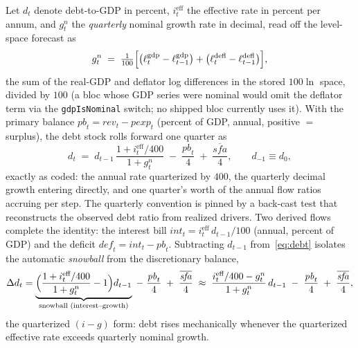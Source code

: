 \documentclass[11pt]{article}
\theoremstyle{plain}
\theoremstyle{remark}
\begin{document}
Let $d_t$ denote debt-to-GDP in percent, $i^{\text{eff}}_t$ the
effective rate in percent per annum, and $g^{n}_t$ the \emph{quarterly}
nominal growth rate in decimal, read off the level-space forecast as
\begin{equation}\label{eq:gn}
  g^{n}_t \;=\;
  \tfrac{1}{100}\Bigl[
   \bigl(\ell^{\text{gdp}}_t - \ell^{\text{gdp}}_{t-1}\bigr)
 + \bigl(\ell^{\text{defl}}_t - \ell^{\text{defl}}_{t-1}\bigr)\Bigr],
\end{equation}
the sum of the real-GDP and deflator log differences in the stored
$100\ln$ space, divided by $100$ (a bloc whose GDP series were nominal
would omit the deflator term via the \texttt{gdpIsNominal} switch; no
shipped bloc currently uses it). With the primary balance
$\mathit{pb}_t = \mathit{rev}_t - \mathit{pexp}_t$ (percent of GDP,
annual, positive $=$ surplus), the debt stock rolls forward one quarter
as
\begin{equation}\label{eq:debt}
  d_t \;=\; d_{t-1}\,
     \frac{1 + i^{\text{eff}}_t/400}{1 + g^{n}_t}
     \;-\; \frac{\mathit{pb}_t}{4}
     \;+\; \frac{\overline{\mathit{sfa}}}{4},
  \qquad d_{-1} \equiv d_0,
\end{equation}
exactly as coded: the annual rate quarterized by $400$, the quarterly
decimal growth entering directly, and one quarter's worth of the annual
flow ratios accruing per step. The quarterly convention is pinned by a
back-cast test that reconstructs the observed debt ratio from realized
drivers. Two derived flows complete the identity: the interest bill
$\mathit{int}_t = i^{\text{eff}}_t\, d_{t-1}/100$ (annual, percent of
GDP) and the deficit $\mathit{def}_t = \mathit{int}_t - \mathit{pb}_t$.
Subtracting $d_{t-1}$ from~\eqref{eq:debt} isolates the automatic
\emph{snowball} from the discretionary balance,
\begin{equation}\label{eq:snowball}
  \Delta d_t
  = \underbrace{\Bigl(\frac{1 + i^{\text{eff}}_t/400}{1 + g^{n}_t} - 1\Bigr) d_{t-1}}_{\text{snowball (interest--growth)}}
  \;-\; \frac{\mathit{pb}_t}{4} \;+\; \frac{\overline{\mathit{sfa}}}{4}
  \;\approx\;
  \frac{i^{\text{eff}}_t/400 - g^{n}_t}{1 + g^{n}_t}\, d_{t-1}
  \;-\; \frac{\mathit{pb}_t}{4} \;+\; \frac{\overline{\mathit{sfa}}}{4},
\end{equation}
the quarterized $(i-g)$ form: debt rises mechanically whenever the
quarterized effective rate exceeds quarterly nominal growth.
\end{document}
